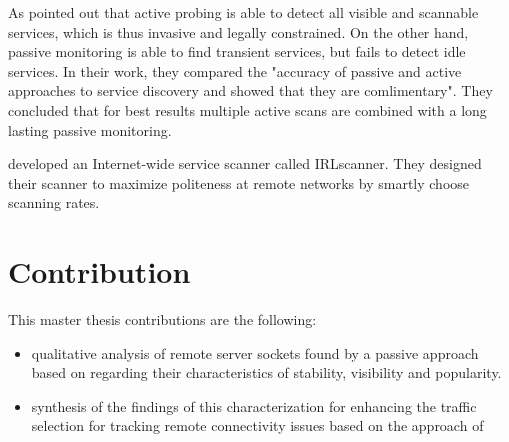 As \citet{Bartlett07b} pointed out that active probing is able to detect all
visible and scannable services, which is thus invasive and legally constrained.
On the other hand, passive monitoring is able to find transient services, but
fails to detect idle services. In their work, they compared the "accuracy of
passive and active approaches to service discovery and showed that they are
comlimentary"\citep{Bartlett07b}. They concluded that for best results multiple
active scans are combined with a long lasting passive monitoring. 

\citet{Leonard:2010} developed an Internet-wide service scanner called
IRLscanner. They designed their scanner to maximize politeness at remote
networks by smartly choose scanning rates. 

\section{Contribution 
\label{sec:contribution}}
This master thesis contributions are the following: 
\begin{itemize}
	\item qualitative analysis of remote server sockets found by a passive approach based on \citet{Schatzmann:Mining,Schatzmann:Dissection, Schatzmann:Tracing} regarding their characteristics of stability, visibility and popularity.
	\item synthesis of the findings of this characterization for enhancing the traffic selection for tracking remote connectivity issues based on the approach of \citet{SchatzmannPAM2011} 
\end{itemize}

